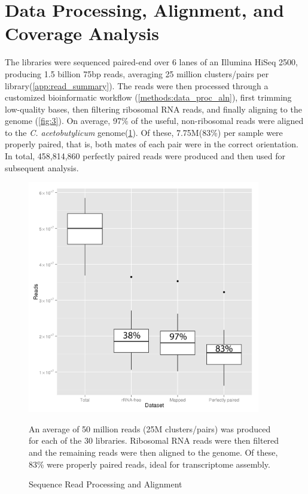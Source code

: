 \section{Data Processing, Alignment, and Coverage Analysis}
The libraries were sequenced paired-end over 6 lanes of an Illumina HiSeq 2500, producing 1.5 billion 75bp reads, averaging 25 million clusters/pairs per library(\ref{app:read_summary}). The reads were then processed through a customized bioinformatic workflow (\ref{methods:data_proc_aln}), first trimming low-quality bases, then filtering ribosomal RNA reads, and finally aligning to the genome (\ref{fig:3}). On average, 97\% of the useful, non-ribosomal reads were aligned to the \textit{C. acetobutylicum} genome(\ref{fig:4}). Of these, 7.75M(83\%) per sample were properly paired, that is, both mates of each pair were in the correct orientation. In total, 458,814,860 perfectly paired reads were produced and then used for subsequent analysis. 

\begin{figure}
\includegraphics[width=\textwidth,height=4in]{images/Sequencing/Alignment_brief.png}
\caption{Sequence Read Processing and Alignment}\label{fig:4}
An average of 50 million reads (25M clusters/pairs) was produced for each of the 30 libraries. Ribosomal RNA reads were then filtered and the remaining reads were then aligned to the genome. Of these, 83\% were properly paired reads, ideal for transcriptome assembly.
\end{figure}

